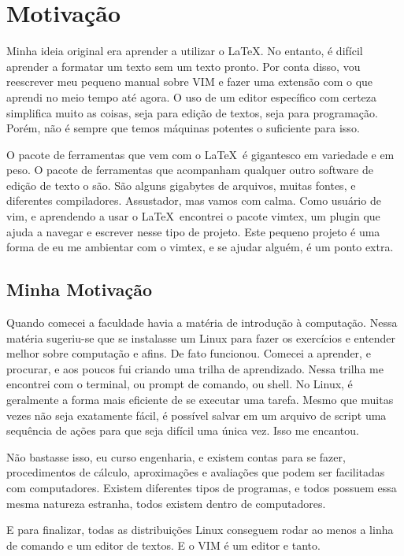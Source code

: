 \chapter{Motivação}
\thispagestyle{fancy}
Minha ideia original era aprender a utilizar o \LaTeX.
No entanto, é difícil aprender a formatar um texto sem um texto pronto.
Por conta disso, vou reescrever meu pequeno manual sobre VIM e fazer uma extensão com o que aprendi no meio tempo até agora.
O uso de um editor específico com certeza simplifica muito as coisas, seja para edição de textos, seja para programação.
Porém, não é sempre que temos máquinas potentes o suficiente para isso.

O pacote de ferramentas que vem com o \LaTeX\ é gigantesco em variedade e em peso.
O pacote de ferramentas que acompanham qualquer outro software de edição de texto o são.
São alguns gigabytes de arquivos, muitas fontes, e diferentes compiladores.
Assustador, mas vamos com calma.
Como usuário de vim, e aprendendo a usar o \LaTeX\, encontrei o pacote vimtex, um plugin que ajuda a
navegar e escrever nesse tipo de projeto.
Este pequeno projeto é uma forma de eu me ambientar com o vimtex, e se ajudar alguém, é um ponto extra.

\section{Minha Motivação}
Quando comecei a faculdade havia a matéria de introdução à computação.
Nessa matéria sugeriu-se que se instalasse um Linux para fazer os exercícios e entender melhor sobre computação e afins.
De fato funcionou.
Comecei a aprender, e procurar, e aos poucos fui criando uma trilha de aprendizado.
Nessa trilha me encontrei com o terminal, ou prompt de comando, ou shell.
No Linux, é geralmente a forma mais eficiente de se executar uma tarefa.
Mesmo que muitas vezes não seja exatamente fácil, é possível salvar em um arquivo de script uma sequência de ações para que seja difícil uma única vez.
Isso me encantou.

Não bastasse isso, eu curso engenharia, e existem contas para se fazer,
procedimentos de cálculo, aproximações e avaliações que podem ser facilitadas com computadores.
Existem diferentes tipos de programas, e todos possuem essa mesma natureza estranha, todos existem dentro de computadores.


E para finalizar, todas as distribuições Linux conseguem rodar ao menos a linha de comando e um editor de textos.
E o VIM é um editor e tanto.

